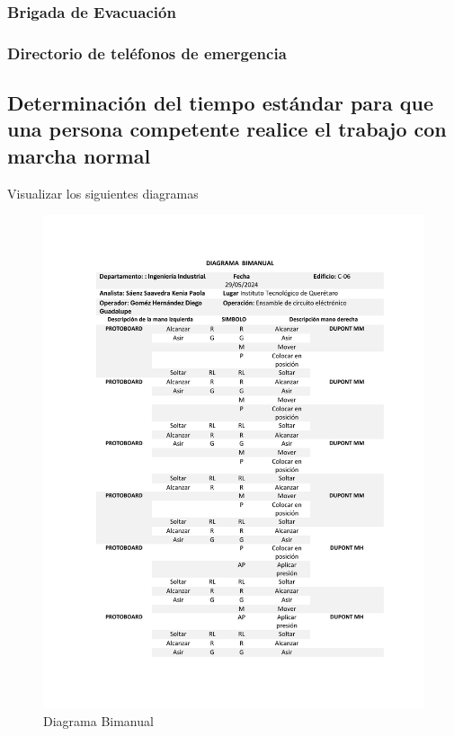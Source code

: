     \subsubsection{Brigada de Evacuación}
    \subsubsection{Directorio de teléfonos de emergencia}
    
    
    \subsection{Determinación del tiempo estándar para que una persona competente realice el trabajo con marcha normal}
    Visualizar los siguientes diagramas
    \begin{figure}[H]
        \centering
        \includegraphics[scale=0.4]{32/img/diagramaBimanual.pdf}
        \caption{Diagrama Bimanual}
        \label{fig:enter-label}
    \end{figure}
